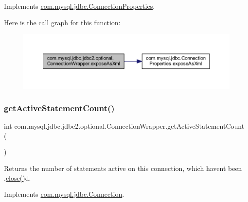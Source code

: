 Implements \mbox{\hyperlink{interfacecom_1_1mysql_1_1jdbc_1_1_connection_properties_a73482b2a70021a34f84dbc38bf1a105a}{com.\+mysql.\+jdbc.\+Connection\+Properties}}.

Here is the call graph for this function\+:
\nopagebreak
\begin{figure}[H]
\begin{center}
\leavevmode
\includegraphics[width=350pt]{classcom_1_1mysql_1_1jdbc_1_1jdbc2_1_1optional_1_1_connection_wrapper_ac3ce990dbc68f651981e2fddf73e9df8_cgraph}
\end{center}
\end{figure}
\mbox{\label{classcom_1_1mysql_1_1jdbc_1_1jdbc2_1_1optional_1_1_connection_wrapper_a72b79457a247fb0cedc5437e3d0d4cf2}} 
\subsubsection{\texorpdfstring{get\+Active\+Statement\+Count()}{getActiveStatementCount()}}
{\footnotesize\ttfamily int com.\+mysql.\+jdbc.\+jdbc2.\+optional.\+Connection\+Wrapper.\+get\+Active\+Statement\+Count (\begin{DoxyParamCaption}{ }\end{DoxyParamCaption})}

Returns the number of statements active on this connection, which haven\textquotesingle{}t been .\mbox{\hyperlink{classcom_1_1mysql_1_1jdbc_1_1jdbc2_1_1optional_1_1_connection_wrapper_a273eb07d1110be957702fa80230e3b5d}{close()}}d. 

Implements \mbox{\hyperlink{interfacecom_1_1mysql_1_1jdbc_1_1_connection_a7a8d8535f6988783755465a542f45ea1}{com.\+mysql.\+jdbc.\+Connection}}.

